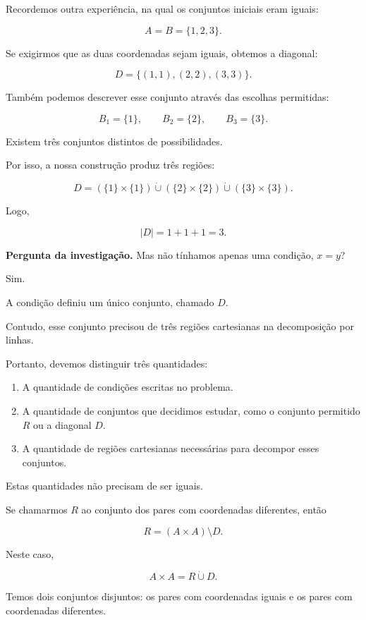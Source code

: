 \documentclass[11pt,a4paper,oneside]{book}
\newcommand{\Pergunta}[1]{\begin{perguntabox}\textbf{Pergunta da investigação.} #1\end{perguntabox}}
\newcommand{\card}[1]{\lvert #1\rvert}
\begin{document}
Recordemos outra experiência,
na qual os conjuntos iniciais
eram iguais:

\[
A=B=\{1,2,3\}.
\]

Se exigirmos que as duas
coordenadas sejam iguais,
obtemos a diagonal:

\[
D=\{(1,1),(2,2),(3,3)\}.
\]

Também podemos descrever
esse conjunto através
das escolhas permitidas:

\[
B_1=\{1\},\qquad
B_2=\{2\},\qquad
B_3=\{3\}.
\]

Existem três conjuntos distintos
de possibilidades.

Por isso, a nossa construção
produz três regiões:

\[
D=
(\{1\}\times\{1\})
\mathbin{\dot\cup}
(\{2\}\times\{2\})
\mathbin{\dot\cup}
(\{3\}\times\{3\}).
\]

Logo,

\[
\card D=1+1+1=3.
\]

\Pergunta{Mas não tínhamos apenas
uma condição, $x=y$?}

Sim.

A condição definiu um único
conjunto, chamado $D$.

Contudo, esse conjunto precisou
de três regiões cartesianas
na decomposição por linhas.

Portanto, devemos distinguir
três quantidades:

\begin{enumerate}
\item A quantidade de condições
escritas no problema.

\item A quantidade de conjuntos
que decidimos estudar, como
o conjunto permitido $R$
ou a diagonal $D$.

\item A quantidade de regiões
cartesianas necessárias para
decompor esses conjuntos.
\end{enumerate}

Estas quantidades não precisam
de ser iguais.

Se chamarmos $R$ ao conjunto
dos pares com coordenadas
diferentes, então

\[
R=(A\times A)\setminus D.
\]

Neste caso,

\[
A\times A=R\mathbin{\dot\cup}D.
\]

Temos dois conjuntos disjuntos:
os pares com coordenadas iguais
e os pares com coordenadas diferentes.
\end{document}
